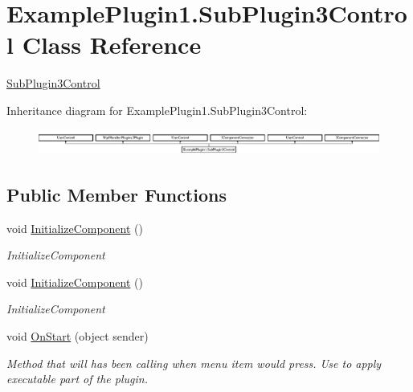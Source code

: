\hypertarget{class_example_plugin1_1_1_sub_plugin3_control}{}\section{Example\+Plugin1.\+Sub\+Plugin3\+Control Class Reference}
\label{class_example_plugin1_1_1_sub_plugin3_control}


\mbox{\hyperlink{class_example_plugin1_1_1_sub_plugin3_control}{Sub\+Plugin3\+Control}}  


Inheritance diagram for Example\+Plugin1.\+Sub\+Plugin3\+Control\+:\begin{figure}[H]
\begin{center}
\leavevmode
\includegraphics[height=0.856269cm]{d3/d25/class_example_plugin1_1_1_sub_plugin3_control}
\end{center}
\end{figure}
\subsection*{Public Member Functions}
\begin{DoxyCompactItemize}
\item 
void \mbox{\hyperlink{class_example_plugin1_1_1_sub_plugin3_control_aead352e90f750577ebd8058ee84d39f7}{Initialize\+Component}} ()
\begin{DoxyCompactList}\small\item\em Initialize\+Component \end{DoxyCompactList}\item 
void \mbox{\hyperlink{class_example_plugin1_1_1_sub_plugin3_control_aead352e90f750577ebd8058ee84d39f7}{Initialize\+Component}} ()
\begin{DoxyCompactList}\small\item\em Initialize\+Component \end{DoxyCompactList}\item 
void \mbox{\hyperlink{class_example_plugin1_1_1_sub_plugin3_control_ae5f63fb75ace89eb36a6d4aa444f61bc}{On\+Start}} (object sender)
\begin{DoxyCompactList}\small\item\em Method that will has been calling when menu item would press. Use to apply executable part of the plugin. \end{DoxyCompactList}\end{DoxyCompactItemize}
